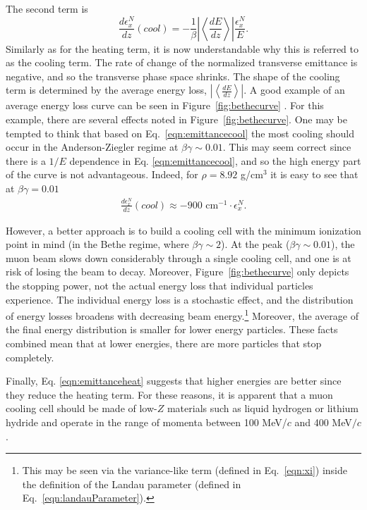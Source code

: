 The second term is
\begin{equation}
\label{eqn:emittancecool}
\frac{d\epsilon_x^N}{dz}(cool)=-\frac{1}{\beta}\left| \left<\frac{dE}{dz}\right>\right| \frac{\epsilon_x^N}{E}.
\end{equation}
Similarly as for the heating term, it is now understandable why this is referred to as the cooling term. The rate of change of the normalized transverse emittance is negative, and so the transverse phase space shrinks. The shape of the cooling term is determined by the average energy loss, $\left|\left<\frac{dE}{dz}\right>\right|$. A good example of an average energy loss curve can be seen in Figure~\ref{fig:bethecurve} \cite{PDG}. For this example, there are several effects noted in Figure~\ref{fig:bethecurve}. One may be tempted to think that based on Eq.~\eqref{eqn:emittancecool} the most cooling should occur in the Anderson-Ziegler regime at $\beta\gamma\sim0.01$. This may seem correct since there is a $1/E$ dependence in Eq. \eqref{eqn:emittancecool}, and so the high energy part of the curve is not advantageous. Indeed, for $\rho= 8.92$ g/cm$^3$ it is easy to see that at $\beta\gamma=0.01$ 
\begin{align*}
\frac{d\epsilon_x^N}{dz}(cool)\approx-900 \text{ cm}^{-1} \cdot \epsilon_x^N.
\end{align*}

However, a better approach is to build a cooling cell with the minimum ionization point in mind (in the Bethe regime, where $\beta\gamma\sim2$). At the peak ($\beta\gamma\sim0.01$), the muon beam slows down considerably through a single cooling cell, and one is at risk of losing the beam to decay. Moreover, Figure~\ref{fig:bethecurve} only depicts the stopping power, not the actual energy loss that individual particles experience. The individual energy loss is a stochastic effect, and the distribution of energy losses broadens with decreasing beam energy.\footnote{This may be seen via the variance-like term (defined in Eq.~\eqref{eqn:xi}) inside the definition of the Landau parameter (defined in Eq.~\eqref{eqn:landauParameter}).} Moreover, the average of the final energy distribution is smaller for lower energy particles. These facts combined mean that at lower energies, there are more particles that stop completely. 

Finally, Eq. \eqref{eqn:emittanceheat} suggests that higher energies are better since they reduce the heating term. For these reasons, it is apparent that a muon cooling cell should be made of low-$Z$ materials such as liquid hydrogen or lithium hydride and operate in the range of momenta between 100 MeV/$c$ and 400 MeV$/c$.

